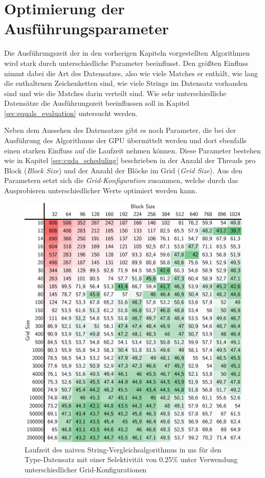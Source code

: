 \chapter{Optimierung der Ausführungsparameter}

Die Ausführungszeit der in den vorherigen Kapiteln vorgestellten Algorithmen wird stark durch unterschiedliche Parameter beeinflusst.
Den größten Einfluss nimmt dabei die Art des Datensatzes, also wie viele Matches er enthält, wie lang die enthaltenen Zeichenketten sind, wie viele Strings im Datensatz vorhanden sind und wie die Matches darin verteilt sind.
Wie sehr unterschiedliche Datensätze die Ausführungszeit beeinflussen soll in Kapitel \ref{sec:equals_evaluation} untersucht werden.

Neben dem Aussehen des Datensatzes gibt es noch Parameter, die bei der Ausführung des Algorithmus der GPU übermittelt werden und dort ebenfalls einen starken Einfluss auf die Laufzeit nehmen können.
Diese Parameter bestehen wie in Kapitel \ref{sec:cuda_scheduling} beschrieben in der Anzahl der Threads pro Block (\emph{Block Size}) und der Anzahl der Blöcke im Grid (\emph{Grid Size}).
Aus den Parametern setzt sich die \emph{Grid-Konfiguration} zusammen, welche durch das Ausprobieren unterschiedlicher Werte optimiert werden kann.

\begin{figure}[ht]
	\includegraphics[]{bilder/parameter025.pdf}
	\caption{Laufzeit des naiven String-Vergleichsalgorithmus in ms für den Type-Datensatz mit einer Selektivität von 0.25\% unter Verwendung unterschiedlicher Grid-Konfigurationen}
	\label{parameter025}
\end{figure}

